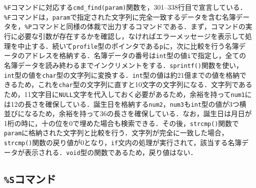 \verb|%F|コマンドに対応する\verb|cmd_find(param)|関数を，301--338行目で宣言している．\verb|%F|コマンドは，\verb|param|で指定された文字列に完全一致するデータを含む名簿データを，\verb|%P|コマンドと同様の体裁で出力するコマンドである．まず，コマンドの実行に必要な引数が存在するかを確認し，なければエラーメッセージを表示して処理を中止する．続いて\verb|profile|型のポインタである\verb|p|に，次に比較を行う名簿データのアドレスを格納する．名簿データの番号は\verb|int|型の値\verb|i|で指定し，全ての名簿データを読み終わるまでインクリメントをする．\verb|sprintf()|関数を使い，\verb|int|型の値を\verb|char|型の文字列に変換する．\verb|int|型の値は約21億までの値を格納できるため，これを\verb|char|型の文字列に直すと10文字の文字列になる．文字列であるため，11文字目に\verb|NULL|文字を代入しておく必要があるため，余裕を持って\verb|num1|には12の長さを確保している．誕生日を格納する\verb|num2|，\verb|num3|も\verb|int|型の値が3つ横並びになるため，余裕を持って36の長さを確保している．なお，誕生日は月日が1桁の時に，十の位を0で埋めた場合も検索できる．その後，\verb|strcmp()|関数で\verb|param|に格納された文字列と比較を行う．文字列が完全に一致した場合，\verb|strcmp()|関数の戻り値が0となり，\verb|if|文内の処理が実行されて，該当する名簿データが表示される．\verb|void|型の関数であるため，戻り値はない．

\subsection{\texttt{\%S}コマンド}

